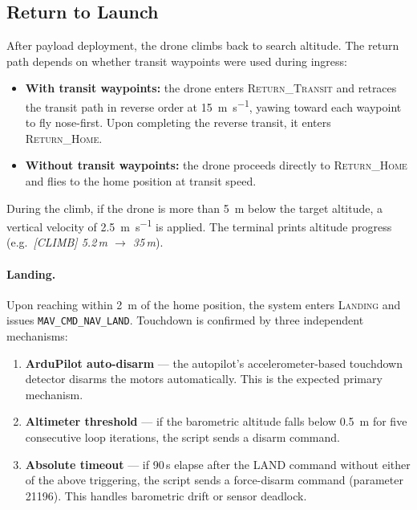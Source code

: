 \subsection{Return to Launch}\label{sec:mf-rtl}

After payload deployment, the drone climbs back to search altitude.  The return path depends on whether transit waypoints were used during ingress:

\begin{itemize}
  \item \textbf{With transit waypoints:} the drone enters \textsc{Return\_Transit} and retraces the transit path in reverse order at \SI{15}{\metre\per\second}, yawing toward each waypoint to fly nose-first.  Upon completing the reverse transit, it enters \textsc{Return\_Home}.
  \item \textbf{Without transit waypoints:} the drone proceeds directly to \textsc{Return\_Home} and flies to the home position at transit speed.
\end{itemize}

\noindent During the climb, if the drone is more than \SI{5}{\metre} below the target altitude, a vertical velocity of \SI{2.5}{\metre\per\second} is applied.  The terminal prints altitude progress (e.g.\ \textit{[CLIMB] 5.2\,m $\rightarrow$ 35\,m}).

\paragraph{Landing.}  Upon reaching within \SI{2}{\metre} of the home position, the system enters \textsc{Landing} and issues \texttt{MAV\_CMD\_NAV\_LAND}.  Touchdown is confirmed by three independent mechanisms:

\begin{enumerate}
  \item \textbf{ArduPilot auto-disarm} --- the autopilot's accelerometer-based touchdown detector disarms the motors automatically.  This is the expected primary mechanism.
  \item \textbf{Altimeter threshold} --- if the barometric altitude falls below \SI{0.5}{\metre} for five consecutive loop iterations, the script sends a disarm command.
  \item \textbf{Absolute timeout} --- if 90\,s elapse after the LAND command without either of the above triggering, the script sends a force-disarm command (parameter 21196).  This handles barometric drift or sensor deadlock.
\end{enumerate}

